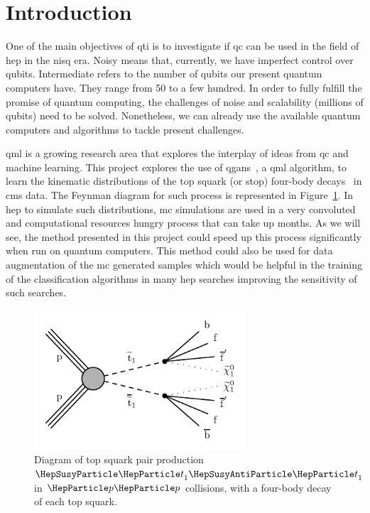 \section{Introduction}
\label{sec:intro}

One of the main objectives of \gls{qti} is to investigate if \gls{qc} can be 
used in the field of \gls{hep} in the \gls{nisq} era. Noisy means that, currently,
we have imperfect control over qubits. Intermediate refers to the number of qubits
our present quantum computers have. They range from 50 to a few hundred. 
In order to fully fulfill the promise of quantum computing, the challenges of
noise and scalability (millions of qubits) need to be solved. Nonetheless, we
can already use the available quantum computers and algorithms to tackle present
challenges. 

\gls{qml} is a growing research area that explores the interplay of ideas from \gls{qc} 
and machine learning. This project explores the use of \glspl{qgan}~\cite{Zoufal_2019}, 
a \gls{qml} algorithm, to learn the kinematic distributions of the top squark (or stop) four-body 
decays~\cite{ph-brief-stop} in \gls{cms} data. The Feynman diagram for such process 
is represented in Figure~\ref{fig:model}. In \gls{hep} to simulate such 
distributions, \gls{mc} simulations are used in a very convoluted and computational
resources hungry process that can take up months. As we will see, the method 
presented in this project could speed up this process significantly when run on 
quantum computers. This method could also be used for data augmentation of the 
\gls{mc} generated samples which would be helpful in the training of the 
classification algorithms in many \gls{hep} searches improving the sensitivity of
such searches.

\clearpage

\begin{figure}[!htbp]
\centering
	\includegraphics[width=0.70\textwidth]{figures/Figure_001.pdf}
\caption{Diagram of top squark pair production $\stp \stpb$ in $\Pp\Pp$ collisions, 
with a four-body decay of each top squark.}
\label{fig:model}
\end{figure}

